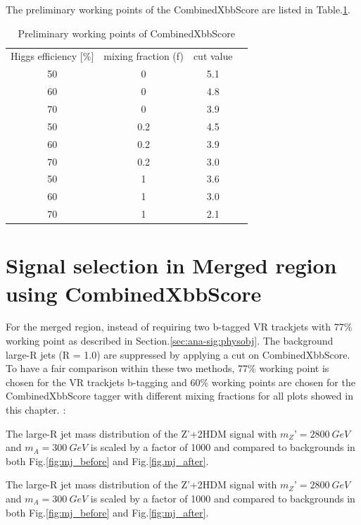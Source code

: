 The preliminary working points of the CombinedXbbScore are listed in Table.\ref{tab:combxbb}.

\begin{table}
    \footnotesize{
        \begin{center}
            \begin{tabular}{ c |c |c |c}
                \hline
                \hline

                Higgs efficiency [\%]	& mixing fraction (f)	& cut value \\
                50	&0	&5.1	 \\
                60	&0	&4.8	 \\
                70	&0	&3.9	 \\
                50	&0.2	&4.5	 \\
                60	&0.2	&3.9	 \\
                70	&0.2	&3.0	 \\
                50	&1	&3.6	 \\
                60	&1	&3.0	 \\
                70	&1	&2.1	\\
                \hline
                \hline
            \end{tabular}
        \end{center}
    }
    \caption{Preliminary working points of CombinedXbbScore}
    \label{tab:combxbb}
\end{table}


\section{Signal selection in Merged region using CombinedXbbScore}
\par For the merged region, instead of requiring two b-tagged VR trackjets  with 77\% working point as described in Section.\ref{sec:ana-sig:physobj}. The background large-R jets (R = 1.0) are suppressed by applying a cut on CombinedXbbScore. To have a fair comparison within these two methods, 77\% working point is chosen for the VR trackjets b-tagging and 60\% working points are chosen for the CombinedXbbScore tagger with different mixing fractions for all plots showed in this chapter.					:\par The large-R jet mass distribution of the Z’+2HDM signal with $m_Z’ = 2800~GeV$ and $m_A = 300~GeV$ is scaled by a factor of 1000 and compared to backgrounds in both Fig.\ref{fig:mj_before} and Fig.\ref{fig.mj_after}. 	
\par The large-R jet mass distribution of the Z’+2HDM signal with $m_Z’ = 2800~GeV$ and $m_A = 300~GeV$ is scaled by a factor of 1000 and compared to backgrounds in both Fig.\ref{fig:mj_before} and Fig.\ref{fig:mj_after}.


